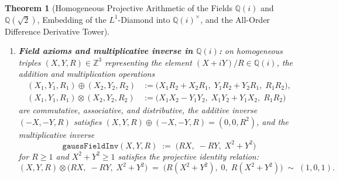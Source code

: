 \documentclass[11pt,a4paper]{article}
\theoremstyle{plain}
\newtheorem{theorem}{Theorem}[section]
\theoremstyle{definition}
\begin{document}
\begin{theorem}[Homogeneous Projective Arithmetic of the Fields $\mathbb{Q}(i)$ and $\mathbb{Q}(\sqrt{2})$, Embedding of the $L^1$-Diamond into $\mathbb{Q}(i)^\times$, and the All-Order Difference Derivative Tower]
\begin{enumerate}[label=\textbf{(\roman*)},leftmargin=*]
\item \textbf{Field axioms and multiplicative inverse in $\mathbb{Q}(i)$:}
  on homogeneous triples $(X, Y, R) \in \mathbb{Z}^3$ representing the element $(X + iY)/R \in \mathbb{Q}(i)$, the addition and multiplication operations
  \begin{align}
    (X_1, Y_1, R_1) \oplus (X_2, Y_2, R_2) &:= \bigl(X_1 R_2 + X_2 R_1,\; Y_1 R_2 + Y_2 R_1,\; R_1 R_2\bigr), \label{eq:gauss-field-add} \\
    (X_1, Y_1, R_1) \otimes (X_2, Y_2, R_2) &:= \bigl(X_1 X_2 - Y_1 Y_2,\; X_1 Y_2 + Y_1 X_2,\; R_1 R_2\bigr) \label{eq:gauss-field-mul}
  \end{align}
  are commutative, associative, and distributive, the additive inverse $(-X, -Y, R)$ satisfies $(X, Y, R) \oplus (-X, -Y, R) = (0, 0, R^2)$, and the multiplicative inverse
  \begin{equation}
    \label{eq:gauss-field-inv-def}
    \texttt{gaussFieldInv}(X, Y, R) \;:=\; \bigl(RX,\; -RY,\; X^2 + Y^2\bigr)
  \end{equation}
  for $R \ge 1$ and $X^2 + Y^2 \ge 1$ satisfies the projective identity relation:
  \begin{equation}
    \label{eq:gauss-field-inverse}
    (X, Y, R) \otimes \bigl(RX,\; -RY,\; X^2 + Y^2\bigr) \;=\; \bigl(R(X^2 + Y^2),\; 0,\; R(X^2 + Y^2)\bigr) \;\sim\; (1, 0, 1).
  \end{equation}


\end{enumerate}
\end{theorem}
\end{document}
